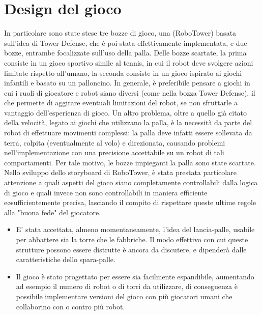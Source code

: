 \section{Design del gioco}
In particolare sono state stese tre bozze di gioco, una (RoboTower) basata sull'idea di Tower Defense, che è poi stata effettivamente implementata, e due bozze, entrambe focalizzate sull'uso della palla. Delle bozze scartate, la prima consiste in un gioco sportivo simile al tennis, in cui il robot deve svolgere azioni limitate rispetto all'umano, la seconda consiste in un gioco ispirato ai giochi infantili e basato su un palloncino.
In generale, è preferibile pensare a giochi in cui i ruoli di giocatore e robot siano diversi (come nella bozza Tower Defense), il che permette di aggirare eventuali limitazioni del robot, se non sfruttarle a vantaggio dell’esperienza di gioco.
Un altro problema, oltre a quello già citato della velocità, legato ai giochi che utilizzano la palla, è la necessità da parte del robot di effettuare movimenti complessi: la palla deve infatti essere sollevata da terra, colpita (eventualmente al volo) e direzionata, causando problemi nell'implementazione con una precisione accettabile su un robot di tali comportamenti. Per tale motivo, le bozze impieganti la palla sono state scartate.
Nello sviluppo dello storyboard di RoboTower, è stata prestata particolare attenzione a quali aspetti del gioco siano completamente controllabili dalla logica di gioco e quali invece non sono controllabili in maniera efficiente e\o sufficientemente precisa, lasciando il compito di rispettare queste ultime regole alla "buona fede" del giocatore.
\begin{itemize}
\item E’ stata accettata, almeno momentaneamente, l’idea del lancia-palle, usabile per abbattere sia la torre che le fabbriche. Il modo effettivo con cui queste strutture possono essere distrutte è ancora da discutere, e dipenderà dalle caratteristiche dello spara-palle.
\item Il gioco è stato progettato per essere sia facilmente espandibile, aumentando ad esempio il numero di robot o di torri da utilizzare, di conseguenza è possibile implementare versioni del gioco con più giocatori umani che collaborino con o contro più robot.
\end{itemize}

